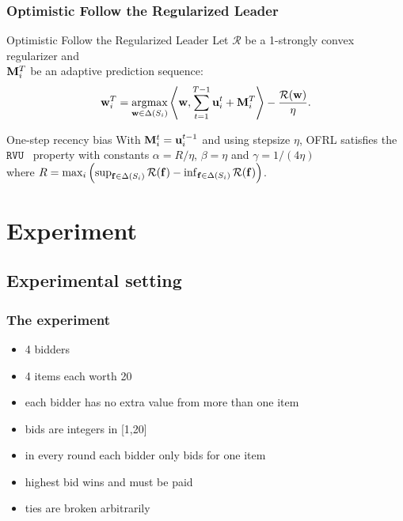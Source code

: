 \documentclass{beamer}
\renewcommand{\vec}[1]{\ensuremath{{\bf #1}}}
\newcommand{\dotp}[2]{\ensuremath{\left\langle #1, #2 \right\rangle}}
\newcommand{\mst}{\ensuremath{w}}
\newcommand{\myprop}{\ensuremath{\texttt{RVU}}}
\newcommand{\mR}{\ensuremath{\mathcal{R}}}
\DeclareMathOperator*{\argmax}{argmax}
\begin{document}
\begin{frame}
	\frametitle{Optimistic Follow the Regularized Leader}
	\begin{block}{Optimistic Follow the Regularized Leader}
		Let $\mR$ be a 1-strongly convex regularizer and\\
		$\vec{M}_i^T$ be an adaptive prediction sequence:
	\begin{equation*}
	\vec{\mst}_i^T
	= \argmax_{\vec{\mst} \in \Delta(S_i)} \dotp{\vec{\mst}}{\sum_{t=1}^{T-1} \vec{u}_i^t
		+ \vec{M}_i^T}-\frac{\mR(\vec{\mst})}{\eta}.
	\end{equation*}
	\end{block}
	\pause
	\begin{block}{One-step recency bias}
		With $\vec{M}_i^t = \vec{u}_i^{t-1}$ and using stepsize $\eta$, OFRL satisfies the \myprop~ property 
		 with constants
			$\alpha = R/\eta$, $\beta = \eta$ and $\gamma
			= 1/(4\eta)$\\
		where $R = \max_i \left(\sup_{\vec{f}\in \Delta(S_i)} \mR(\vec{f})-\inf_{\vec{f}\in \Delta(S_i)}\mR(\vec{f})\right)$.
		
	\end{block}
	
\end{frame}


\section{Experiment}
\subsection{Experimental setting}
\begin{frame}
	\frametitle{The experiment}
	\begin{itemize}
		\item 4 bidders
		\item 4 items each worth 20
		\item each bidder has no extra value from more than one item
		\item bids are integers in [1,20]
		\item in every round each bidder only bids for one item 
		\item highest bid wins and must be paid
		\item ties are broken arbitrarily 
	\end{itemize}
\end{frame}
\end{document}
